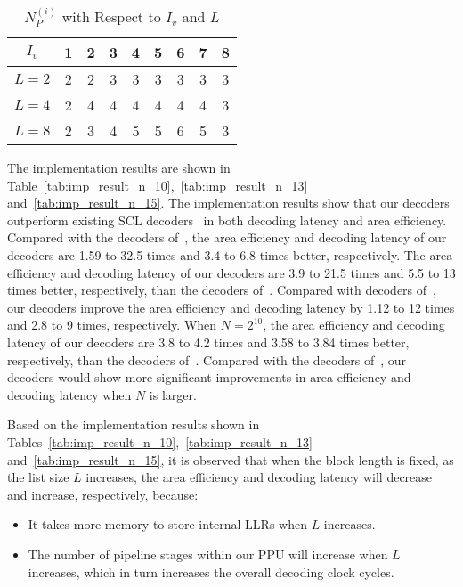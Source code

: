 \documentclass[journal]{IEEEtran}
\begin{document}
\begin{table}[hbt]
  \centering
  \caption{$N_P^{(i)}$ with Respect to $I_v$ and $L$}
  \label{tab: addi_cycles}
  \footnotesize
  \begin{tabular}{c||c|c|c|c|c|c|c|c}
    \hline
   $I_v$& 1 & 2 & 3 & 4 & 5 & 6 & 7& 8 \\ \hline\hline

  $L=2$    & 2         & 2        & 3        & 3        & 3        & 3        &  3       & 3 \\ \hline
$L=4$    & 2         & 4        & 4        & 4        & 4         & 4        &  4       & 3 \\ \hline
  $L=8$   & 2         &3         & 4        &5         &5          &6        & 5        & 3 \\ \hline
  \end{tabular}
\end{table}

The implementation results are shown in Table~\ref{tab:imp_result_n_10},~\ref{tab:imp_result_n_13} and~\ref{tab:imp_result_n_15}. The implementation results show that our decoders outperform existing SCL decoders~\cite{llr_list_tsp,jun_low_mem_list,yuan_low_latency} in both decoding latency and area efficiency. Compared with the decoders of~\cite{llr_list_tsp}, the area efficiency and decoding latency of our decoders are 1.59 to 32.5 times and 3.4 to 6.8 times better, respectively. The area efficiency and decoding latency of our decoders are 3.9 to 21.5 times and 5.5 to 13 times better, respectively, than the decoders of~\cite{jun_low_mem_list}. Compared with decoders of~\cite{chenrong_tsp}, our decoders improve the area efficiency and decoding latency by 1.12 to 12 times and 2.8 to 9 times, respectively. When $N=2^{10}$, the area efficiency and decoding latency of our decoders are 3.8 to 4.2 times and 3.58 to 3.84 times better, respectively, than the decoders of~\cite{yuan_low_latency}. Compared with the decoders of~\cite{yuan_low_latency}, our decoders would show more significant improvements in area efficiency and decoding latency when $N$ is larger.


Based on the implementation results shown in Tables~\ref{tab:imp_result_n_10},~\ref{tab:imp_result_n_13} and~\ref{tab:imp_result_n_15}, it is observed that when the block length is fixed, as the list size $L$ increases, the area efficiency and decoding latency will decrease and increase, respectively, because:
\begin{itemize}
\item It takes more memory to store internal LLRs when $L$ increases.
\item The number of pipeline stages within our PPU will increase when $L$ increases, which in turn increases the overall decoding clock cycles.
\end{itemize}
\end{document}
